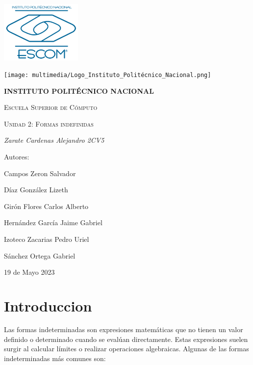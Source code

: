 \documentclass{article}
\begin{document}
\begin{titlepage}
    {\includegraphics[width=0.3\textwidth]{multimedia/ESCOM-Logo.png}}
    \hfill
    {\texttt{[image: multimedia/Logo\_Instituto\_Politécnico\_Nacional.png]}\par}
    \vspace{1cm}
    \centering
    {\bfseries\LARGE  INSTITUTO POLIT\'ECNICO NACIONAL\par}
    \vspace{1cm}
    {\scshape\LARGE Escuela Superior de C\'omputo\par}
    \vspace{1cm}
    {\scshape\Huge Unidad 2: Formas indefinidas \par}
    \vspace{2cm}
    {\itshape\Large Zarate Cardenas Alejandro 2CV5\par}
    \vfill
    {\Large Autores:\par}
    {\Large Campos Zeron Salvador\par}
    {\Large Díaz González Lizeth\par}
    {\Large Girón Flores Carlos Alberto\par}
    {\Large Hernández García Jaime Gabriel\par}
    {\Large Izoteco Zacarias Pedro Uriel\par}
    {\Large S\'anchez Ortega Gabriel\par}
    \vfill
    {\Large 19 de Mayo 2023 \par}
\end{titlepage}
\renewcommand*\contentsname{Indice}
\tableofcontents
\newpage
\section{Introduccion}
Las formas indeterminadas son expresiones matemáticas que no tienen un valor definido o determinado cuando se evalúan directamente. Estas expresiones suelen surgir al calcular límites o realizar operaciones algebraicas. Algunas de las formas indeterminadas más comunes son:
\end{document}
